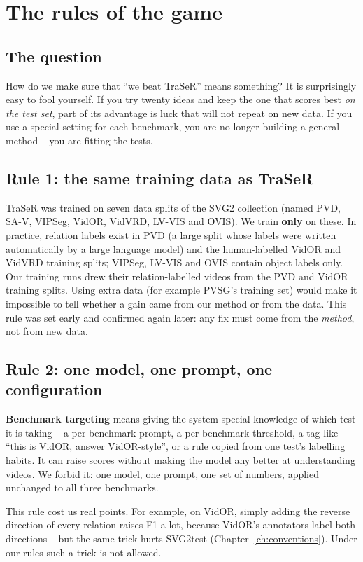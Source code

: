 \documentclass[11pt,openany]{book}
\newcommand{\qsec}{\section*{The question}}
\begin{document}
\chapter{The rules of the game}\label{ch:rules}

\qsec
How do we make sure that ``we beat TraSeR'' means something? It is surprisingly easy to fool yourself. If you try twenty ideas and
keep the one that scores best \emph{on the test set}, part of its advantage is luck that will not repeat on new data. If you use a
special setting for each benchmark, you are no longer building a general method -- you are fitting the tests.

\section{Rule 1: the same training data as TraSeR}
TraSeR was trained on seven data splits of the SVG2 collection (named PVD, SA-V, VIPSeg, VidOR, VidVRD, LV-VIS and OVIS). We train
\textbf{only} on these. In practice, relation labels exist in PVD (a large split whose labels were written automatically by a large
language model) and the human-labelled VidOR and VidVRD training splits; VIPSeg, LV-VIS and OVIS contain object labels only. Our training runs drew their relation-labelled videos from the PVD and VidOR training splits. Using
extra data (for example PVSG's training set) would make it impossible to tell whether a gain came from our method or from the
data. This rule was set early and confirmed again later: any fix must come from the \emph{method}, not from new data.

\section{Rule 2: one model, one prompt, one configuration}
\begin{keyidea}
\textbf{Benchmark targeting} means giving the system special knowledge of which test it is taking -- a per-benchmark prompt, a
per-benchmark threshold, a tag like ``this is VidOR, answer VidOR-style'', or a rule copied from one test's labelling habits.
It can raise scores without making the model any better at understanding videos. We forbid it: one model, one prompt, one set of
numbers, applied unchanged to all three benchmarks.
\end{keyidea}
This rule cost us real points. For example, on VidOR, simply adding the reverse direction of every relation raises F1 a lot,
because VidOR's annotators label both directions -- but the same trick hurts SVG2test (Chapter~\ref{ch:conventions}). Under our
rules such a trick is not allowed.
\end{document}
